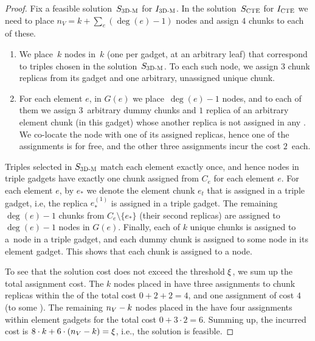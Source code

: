 \begin{proof}
  Fix a feasible solution~$S_{\mathrm{\textsc{3D-M}}}$ for $I_{\mathrm{\textsc{3D-M}}}$. In the solution~$S_{\mathrm{\textsc{CTE}}}$ for $I_{\mathrm{\textsc{CTE}}}$ we need to place $n_V = k + \sum_e(\deg(e) - 1)$ nodes and assign $4$ chunks to each of these.
  \begin{enumerate}
    \item We place~$k$ nodes in~$k$ {\TripleGadgets} (one per gadget, at an arbitrary leaf) that correspond to triples chosen in the solution~$S_{\mathrm{\textsc{3D-M}}}$.
    To each such node, we assign $3$ chunk replicas from its gadget and one arbitrary, unassigned unique chunk.
    \item For each element $e$, in $G(e)$ we place~$\deg(e) - 1$ nodes, and to each of them we assign $3$~arbitrary dummy chunks and $1$ replica of an arbitrary 
    element chunk (in this
    gadget) whose another replica is not assigned in any {\TripleGadget}.
    We co-locate the node with one of its assigned replicas, hence one of the assignments is for free, and the other three assignments incur the cost $2$~each.
  \end{enumerate}
  Triples selected in $S_{\mathrm{\textsc{3D-M}}}$ match each element exactly once,
  and hence nodes in triple gadgets have exactly one chunk assigned from $C_e$ for each element $e$.
  For each element $e$, by $e_*$ we denote the element chunk $e_t$ that is assigned in a triple gadget, i.e, the replica $e_*^{(1)}$ is assigned in a triple gadget.
  The remaining $\deg(e)-1$ chunks from $C_e \setminus \{ e_* \}$ (their second replicas) are assigned to $\deg(e)-1$ nodes in $G(e)$.
  Finally, each of $k$ unique chunks is assigned to a~node in a triple gadget, and each dummy chunk is assigned to some node in its element gadget.
  This shows that each chunk is assigned to a node.
  
  To see that the solution cost does not exceed the threshold $\xi$, we sum up the total assignment cost.
  The $k$ nodes placed in \TripleGadgets{} have three assignments to chunk replicas within the \TripleGadget{} of the total cost $0+2+2=4$, and one assignment of cost $4$ (to some \UnqGadget{}).
  The remaining $n_V-k$ nodes placed in the \CoverSubtree{} have four assignments within element gadgets for the total cost $0+3\cdot 2 = 6$.
  Summing up, the incurred cost is $8\cdot k + 6\cdot (n_V - k) = \xi$, i.e., the solution is feasible.
\end{proof}

